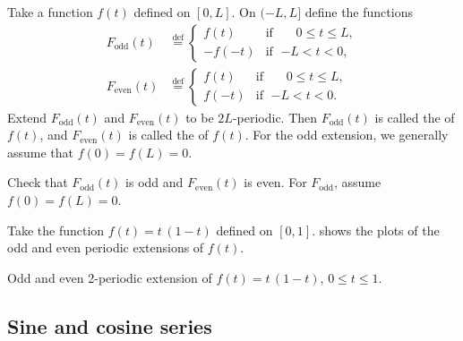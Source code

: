 Take a function $f(t)$ defined on $[0,L]$.  On $(-L,L]$ define the functions
\begin{align*}
F_{\text{odd}}(t) & \overset{\text{def}}{=}
\begin{cases}
f(t) & \text{if } \; \phantom{-}0 \leq t \leq L , \\
-f(-t) & \text{if } \; {-L} < t < 0 ,
\end{cases}
\\
F_{\text{even}}(t) & \overset{\text{def}}{=}
\begin{cases}
f(t) & \text{if } \; \phantom{-}0 \leq t \leq L , \\
f(-t) & \text{if } \; {-L} < t < 0 .
\end{cases}
\end{align*}
Extend $F_{\text{odd}}(t)$ and $F_{\text{even}}(t)$ to be $2L$-periodic.
Then
$F_{\text{odd}}(t)$ is called
the \emph{} of $f(t)$, and
$F_{\text{even}}(t)$ is called the
\emph{} of $f(t)$.
For the odd extension, we generally assume that $f(0) = f(L) = 0$.

\begin{exercise}
Check that $F_{\text{odd}}(t)$ is odd and $F_{\text{even}}(t)$ is even.
For $F_{\text{odd}}$,
assume $f(0) = f(L) = 0$.
\end{exercise}

\begin{example}
Take the function $f(t) = t\,(1-t)$ defined on $[0,1]$. 
shows the plots of the odd and even periodic extensions of $f(t)$.

\begin{myfig}
\capstart
\caption{Odd and even 2-periodic extension of $f(t) =
t\,(1-t)$, $0 \leq t \leq 1$.\label{scs:oddevenextfig}}
\end{myfig}
\end{example}

\subsection{Sine and cosine series}

